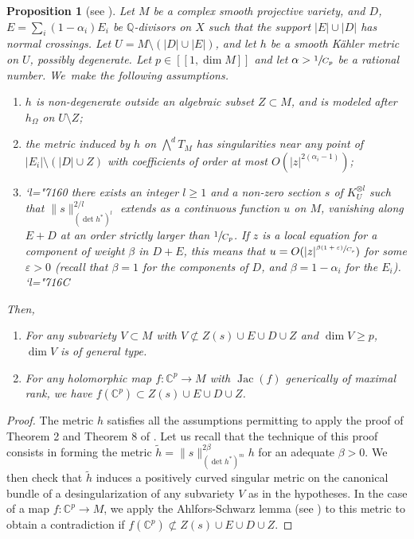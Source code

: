 \documentclass[JEP,XML,SOM,Unicode, NoEqCountersInSection,NoFloatCountersInSection,published]{cedram}
\newcommand{\Changel}{\mathcode`l="7160}
\newcommand{\Changelback}{\mathcode`l="716C}
\newenvironment{enumeratei}
{\bgroup\def\theenumi{\roman{enumi}}\def\theenumii{\arabic{enumii}}\begin{enumerate}}
{\end{enumerate}\egroup}
\newenvironment{enumeratea}
{\bgroup\def\theenumi{\alph{enumi}}\begin{enumerate}}
{\end{enumerate}\egroup}
\newcommand{\llbracket}{[\![}
\newcommand{\rrbracket}{]\!]}
\let\epsilon\varepsilon
\DeclareMathOperator{\Jac}{Jac}
\theoremstyle{theorem}
\newtheorem{proposition}{Proposition} [section]
\theoremstyle{definition}
\begin{document}
\begin{proposition} [see \cite{cad18}] \label{propcritmetric}
Let $M$ be a complex smooth projective variety, and $D$, $E = \sum_{i} (1 - \alpha_i) E_i$ be $\mathbb Q$-divisors on $X$ such that the support $|E| \cup |D|$ has normal crossings. Let $U = M \setminus (|D| \cup |E|)$, and let $h$ be a smooth Kähler metric on $U$, possibly degenerate. Let $p \in \llbracket 1, \dim M \rrbracket$ and let $\alpha > \sfrac{1}{C_p}$ be a rational number. We~make the following assumptions.
\begin{enumeratei}
\item\label{propcritmetrici} $h$ is non-degenerate outside an algebraic subset $Z \subset M$, and is modeled after $h_{\Omega}$ on $U\setminus Z$;

\item\label{propcritmetricii} the metric induced by $h$ on $\bigwedge^d T_{M}$ has singularities near any point of $|E_i| \setminus (|D| \cup Z)$ with coefficients of order at most $O(|z|^{2(\alpha_i - 1)})$;

\item\label{propcritmetriciii}
\Changel{} there exists an integer \(l \geq 1\) and a non-zero section $s$ of $K_U^{\otimes l}$ such that $\| s \|_{(\det h^\ast)^l}^{2/l}$ extends as a continuous function $u$ on $M$, vanishing along $E + D$ at an order strictly larger than $\sfrac{1}{C_p}$. If $z$ is a local equation for a component of weight $\beta$ in $D + E$, this means that $u = O(|z|^{\sfrac{\beta(1 + \epsilon)}{C_p}})$ for some $\epsilon > 0$ (recall that $\beta =1$ for the components of $D$, and $\beta = 1 - \alpha_i$ for the $E_i$).
\Changelback
\end{enumeratei}

Then,
\begin{enumeratea}
\item\label{propcritmetrica} For any subvariety $V \subset M$ with $V \not\subset Z(s) \cup E \cup D \cup Z$ and $\dim V \geq p$, $\dim V$ is of general type.
\item\label{propcritmetricb} For any holomorphic map $f : \mathbb C^p \to M$ with $\Jac(f)$ generically of maximal rank, we have $f(\mathbb C^p) \subset Z(s) \cup E \cup D \cup Z$.
\end{enumeratea}
\end{proposition}

\begin{proof}
The metric $h$ satisfies all the assumptions permitting to apply the proof of Theorem 2 and Theorem 8 of \cite{cad18}.
Let us recall that the technique of this proof consists in forming the metric $\widetilde{h} = \| s \|_{(\det h^\ast)^m}^{2 \beta} h$ for an adequate $\beta > 0$. We then check that $\widetilde{h}$ induces a positively curved singular metric on the canonical bundle of a desingularization of any subvariety $V$ as in the hypotheses. In the case of a map $f : \mathbb C^p \to M$, we apply the Ahlfors-Schwarz lemma (see \cite[4.2]{dem12a}) to this metric to obtain a contradiction if $f(\mathbb C^p) \not\subset Z(s) \cup E \cup D \cup Z$.
\end{proof}
\end{document}
